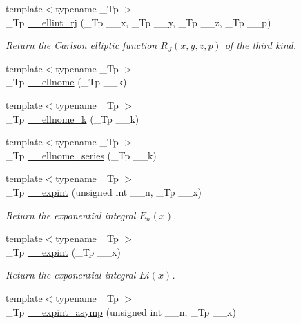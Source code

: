 \begin{DoxyCompactItemize}
{\footnotesize template$<$typename \+\_\+\+Tp $>$ }\\\+\_\+\+Tp \hyperlink{namespacestd_1_1____detail_afe05ce66130b5f47389137c3f9aa6949}{\+\_\+\+\_\+ellint\+\_\+rj} (\+\_\+\+Tp \+\_\+\+\_\+x, \+\_\+\+Tp \+\_\+\+\_\+y, \+\_\+\+Tp \+\_\+\+\_\+z, \+\_\+\+Tp \+\_\+\+\_\+p)
\begin{DoxyCompactList}\small\item\em Return the Carlson elliptic function $ R_J(x,y,z,p) $ of the third kind. \end{DoxyCompactList}\item 
{\footnotesize template$<$typename \+\_\+\+Tp $>$ }\\\+\_\+\+Tp \hyperlink{namespacestd_1_1____detail_ac94c9cd28ee7973229e4a63d9b984711}{\+\_\+\+\_\+ellnome} (\+\_\+\+Tp \+\_\+\+\_\+k)
\item 
{\footnotesize template$<$typename \+\_\+\+Tp $>$ }\\\+\_\+\+Tp \hyperlink{namespacestd_1_1____detail_a7631f367a1be34f98cec2021d588457b}{\+\_\+\+\_\+ellnome\+\_\+k} (\+\_\+\+Tp \+\_\+\+\_\+k)
\item 
{\footnotesize template$<$typename \+\_\+\+Tp $>$ }\\\+\_\+\+Tp \hyperlink{namespacestd_1_1____detail_aec07b9131f90495831d349d22768425f}{\+\_\+\+\_\+ellnome\+\_\+series} (\+\_\+\+Tp \+\_\+\+\_\+k)
\item 
{\footnotesize template$<$typename \+\_\+\+Tp $>$ }\\\+\_\+\+Tp \hyperlink{namespacestd_1_1____detail_a0282700710ec07b8ca095fe2ec140d6e}{\+\_\+\+\_\+expint} (unsigned int \+\_\+\+\_\+n, \+\_\+\+Tp \+\_\+\+\_\+x)
\begin{DoxyCompactList}\small\item\em Return the exponential integral $ E_n(x) $. \end{DoxyCompactList}\item 
{\footnotesize template$<$typename \+\_\+\+Tp $>$ }\\\+\_\+\+Tp \hyperlink{namespacestd_1_1____detail_abefd4102ce8a673604204e360074ceaa}{\+\_\+\+\_\+expint} (\+\_\+\+Tp \+\_\+\+\_\+x)
\begin{DoxyCompactList}\small\item\em Return the exponential integral $ Ei(x) $. \end{DoxyCompactList}\item 
{\footnotesize template$<$typename \+\_\+\+Tp $>$ }\\\+\_\+\+Tp \hyperlink{namespacestd_1_1____detail_a40a59e40ddbb049a8fd84959afd9ec7e}{\+\_\+\+\_\+expint\+\_\+asymp} (unsigned int \+\_\+\+\_\+n, \+\_\+\+Tp \+\_\+\+\_\+x)

\end{DoxyCompactItemize}
